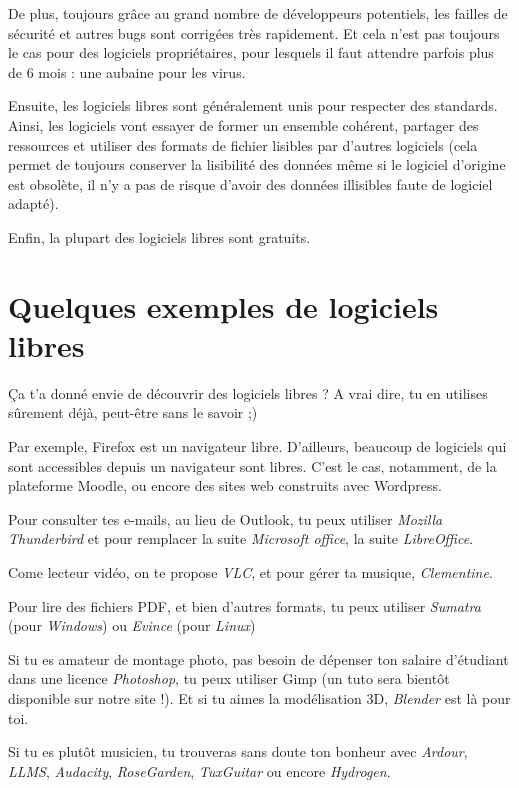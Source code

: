\documentclass[11pt]{../fiche}
\begin{document}
De plus, toujours grâce au grand nombre de développeurs potentiels,
les failles de sécurité et autres bugs sont corrigées très rapidement. Et cela n'est pas
toujours le cas pour des logiciels propriétaires, pour lesquels il 
faut attendre parfois plus de 6 mois : une aubaine pour les virus.

Ensuite, les logiciels libres sont généralement unis pour respecter des
standards. Ainsi, les logiciels vont essayer de former un ensemble cohérent,
partager des ressources et utiliser des formats de fichier lisibles par
d'autres logiciels (cela permet de toujours conserver la lisibilité des données
même si le logiciel d'origine est obsolète, il n'y a pas de risque d'avoir des
données illisibles faute de logiciel adapté).

Enfin, la plupart des logiciels libres sont gratuits.

\section*{Quelques exemples de logiciels libres}

Ça t'a donné envie de découvrir des logiciels libres ? A vrai dire, tu en utilises sûrement déjà, peut-être sans le savoir ;)

Par exemple, Firefox est un navigateur libre. D'ailleurs, beaucoup de logiciels qui sont accessibles depuis un navigateur sont libres. C'est le cas, notamment, de la plateforme Moodle, ou encore des sites web construits avec Wordpress.

Pour consulter tes e-mails, au lieu de Outlook, tu peux utiliser \textit{Mozilla Thunderbird} et pour remplacer la suite \textit{Microsoft office}, la suite \textit{LibreOffice}.

Come lecteur vidéo, on te propose \textit{VLC}, et pour gérer ta musique, \textit{Clementine}.

Pour lire des fichiers PDF, et bien d'autres formats, tu peux utiliser \textit{Sumatra} (pour \textit{Windows}) ou \textit{Evince} (pour \textit{Linux})

Si tu es amateur de montage photo, pas besoin de dépenser ton salaire d'étudiant dans une licence \textit{Photoshop}, tu peux utiliser Gimp (un tuto sera bientôt disponible sur notre site !). Et si tu aimes la modélisation 3D, \textit{Blender} est là pour toi.

Si tu es plutôt musicien, tu trouveras sans doute ton bonheur avec \textit{Ardour}, \textit{LLMS}, \textit{Audacity}, \textit{RoseGarden}, \textit{TuxGuitar} ou encore  \textit{Hydrogen}.
\end{document}
